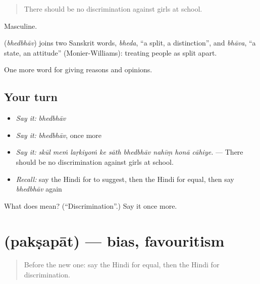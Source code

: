 \begin{quote}
There should be no discrimination against girls at school.
\end{quote}

Masculine.

\begin{cousinweb}
\textbf{} (\emph{bhedbhāv}) joins two Sanskrit words, \emph{bheda}, \textquotedblleft{}a split, a distinction\textquotedblright{}, and \emph{bhāva}, \textquotedblleft{}a state, an attitude\textquotedblright{} (Monier-Williams): treating people as split apart.
\end{cousinweb}

\begin{grammarlens}[title={What you've built}]
One more word for giving reasons and opinions.
\end{grammarlens}

\subsection*{Your turn}
\begin{itemize}
\raggedright
  \item \emph{Say it:} \emph{bhedbhāv}
  \item \emph{Say it:} \emph{bhedbhāv}, once more
  \item \emph{Say it:} \emph{skūl meṁ laṛkiyoṁ ke sāth bhedbhāv nahīṃ honā cāhiye.} — There should be no discrimination against girls at school.
  \item \emph{Recall:} say the Hindi for to suggest, then the Hindi for equal, then say \emph{bhedbhāv} again
\end{itemize}

\begin{tcolorbox}[breakable,colback=teal!4,colframe=teal!35!black,title={Before you move on}]
What does  mean? (\textquotedblleft{}Discrimination\textquotedblright{}.) Say it once more.
\end{tcolorbox}
\section[\texorpdfstring{\hi{पक्षपात} (pakṣapāt)}{पक्षपात (pakṣapāt)}]{ (pakṣapāt) — bias, favouritism}

\label{lesson:HI-C356-paksapat}



\begin{quote}
Before the new one: say the Hindi for equal, then the Hindi for discrimination.
\end{quote}

